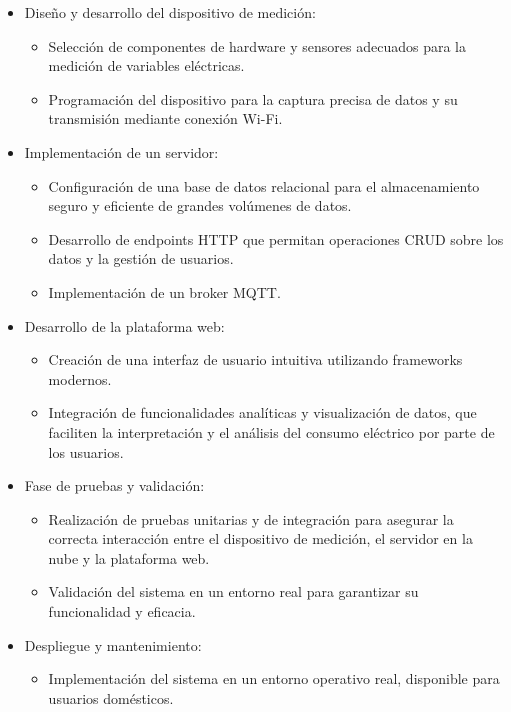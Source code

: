 \begin{itemize}
	\item Diseño y desarrollo del dispositivo de medición:
		\begin{itemize}
		\item Selección de componentes de hardware y sensores adecuados para la medición de variables eléctricas.
		\item Programación del dispositivo para la captura precisa de datos y su transmisión mediante conexión Wi-Fi.
		\end{itemize}
	\item Implementación de un servidor:
		\begin{itemize}
		\item Configuración de una base de datos relacional para el almacenamiento seguro y eficiente de grandes volúmenes de datos.
		\item Desarrollo de endpoints HTTP que permitan operaciones CRUD \cite{crud} sobre los datos y la gestión de usuarios.
		\item Implementación de un broker MQTT.
		\end{itemize}
	\item Desarrollo de la plataforma web:
	\begin{itemize}
		\item Creación de una interfaz de usuario intuitiva utilizando frameworks modernos.
		\item Integración de funcionalidades analíticas y visualización de datos, que faciliten la interpretación y el análisis del consumo eléctrico por parte de los usuarios.
	\end{itemize}
	\item Fase de pruebas y validación:
	\begin{itemize}
		\item Realización de pruebas unitarias y de integración para asegurar la correcta interacción entre el dispositivo de medición, el servidor en la nube y la plataforma web.
		\item Validación del sistema en un entorno real para garantizar su funcionalidad y eficacia.
	\end{itemize}
	\item Despliegue y mantenimiento:
	\begin{itemize}
		\item Implementación del sistema en un entorno operativo real, disponible para usuarios domésticos.
	\end{itemize}
\end{itemize} 


